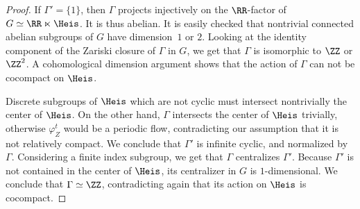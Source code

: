 \begin{proof}
If $\Gamma'= \{1 \}$, then $\Gamma$ projects injectively on the $\RR$-factor of $G\simeq \RR \ltimes \Heis$. It is thus abelian. It is easily checked that nontrivial connected abelian subgroups of $G$ have dimension~$1$ or $2$. Looking at the identity component of the Zariski closure of $\Gamma$ in $G$, we get that $\Gamma$ is isomorphic to $\ZZ$ or $\ZZ^2$. A cohomological dimension argument shows that the action of $\Gamma$ can not be cocompact on $\Heis$.

Discrete subgroups of $\Heis$ which are not cyclic must intersect nontrivially the center of $\Heis$. On the other hand, $\Gamma$ intersects the center of $\Heis$ trivially, otherwise $\varphi_Z^t$ would be a periodic flow, contradicting our assumption that it is not relatively compact. We conclude that $\Gamma'$ is infinite cyclic, and normalized by $\Gamma$. Considering a finite index subgroup, we get that $\Gamma$ centralizes $\Gamma'$. Because $\Gamma'$ is not contained in the center of $\Heis$, its centralizer in $G$ is $1$-dimensional. We conclude that $\Gamma \simeq \ZZ$, contradicting again that its action on $\Heis$ is cocompact.
\end{proof}





